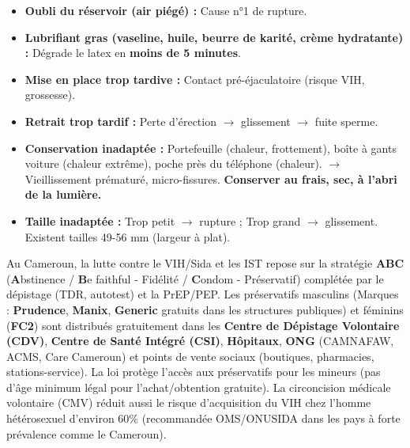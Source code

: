 \documentclass[11pt]{article}
\begin{document}
\begin{attention}
\begin{itemize}
    \item \textbf{Oubli du réservoir (air piégé) :} Cause n°1 de rupture.
    \item \textbf{Lubrifiant gras (vaseline, huile, beurre de karité, crème hydratante) :} Dégrade le latex en \textbf{moins de 5 minutes}.
    \item \textbf{Mise en place trop tardive :} Contact pré-éjaculatoire (risque VIH, grossesse).
    \item \textbf{Retrait trop tardif :} Perte d'érection $\rightarrow$ glissement $\rightarrow$ fuite sperme.
    \item \textbf{Conservation inadaptée :} Portefeuille (chaleur, frottement), boîte à gants voiture (chaleur extrême), poche près du téléphone (chaleur). $\rightarrow$ Vieillissement prématuré, micro-fissures. \textbf{Conserver au frais, sec, à l'abri de la lumière.}
    \item \textbf{Taille inadaptée :} Trop petit $\rightarrow$ rupture ; Trop grand $\rightarrow$ glissement. Existent tailles 49-56 mm (largeur à plat).
\end{itemize}
\end{attention}

\begin{savaistu}
Au Cameroun, la lutte contre le VIH/Sida et les IST repose sur la stratégie \textbf{ABC} (\textbf{A}bstinence / \textbf{B}e faithful - Fidélité / \textbf{C}ondom - Préservatif) complétée par le dépistage (TDR, autotest) et la PrEP/PEP. Les préservatifs masculins (Marques : \textbf{Prudence}, \textbf{Manix}, \textbf{Generic} gratuits dans les structures publiques) et féminins (\textbf{FC2}) sont distribués gratuitement dans les \textbf{Centre de Dépistage Volontaire (CDV)}, \textbf{Centre de Santé Intégré (CSI)}, \textbf{Hôpitaux}, \textbf{ONG} (CAMNAFAW, ACMS, Care Cameroun) et points de vente sociaux (boutiques, pharmacies, stations-service). La loi protège l'accès aux préservatifs pour les mineurs (pas d'âge minimum légal pour l'achat/obtention gratuite). La circoncision médicale volontaire (CMV) réduit aussi le risque d'acquisition du VIH chez l'homme hétérosexuel d'environ 60\% (recommandée OMS/ONUSIDA dans les pays à forte prévalence comme le Cameroun).
\end{savaistu}
\end{document}
